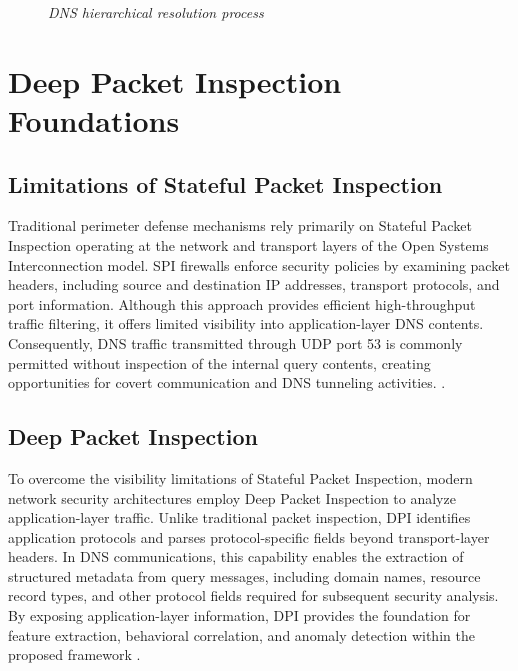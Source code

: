 \documentclass[14pt, a4paper, oneside]{report}
\begin{document}
\begin{figure}[H]
\caption{\textit{DNS hierarchical resolution process}}
\label{fig:dns_hierarchical_resolution}
\end{figure}


\section{Deep Packet Inspection Foundations}
\label{sec:packet_inspection}

\subsection{Limitations of Stateful Packet Inspection}
Traditional perimeter defense mechanisms rely primarily on Stateful Packet Inspection operating at the network and transport layers of the Open Systems Interconnection model. SPI firewalls enforce security policies by examining packet headers, including source and destination IP addresses, transport protocols, and port information. Although this approach provides efficient high-throughput traffic filtering, it offers limited visibility into application-layer DNS contents. Consequently, DNS traffic transmitted through UDP port 53 is commonly permitted without inspection of the internal query contents, creating opportunities for covert communication and DNS tunneling activities. \cite{suricata}.

\subsection{Deep Packet Inspection}
To overcome the visibility limitations of Stateful Packet Inspection, modern network security architectures employ Deep Packet Inspection to analyze application-layer traffic. Unlike traditional packet inspection, DPI identifies application protocols and parses protocol-specific fields beyond transport-layer headers. In DNS communications, this capability enables the extraction of structured metadata from query messages, including domain names, resource record types, and other protocol fields required for subsequent security analysis. By exposing application-layer information, DPI provides the foundation for feature extraction, behavioral correlation, and anomaly detection within the proposed framework \cite{suricata}.
\end{document}
